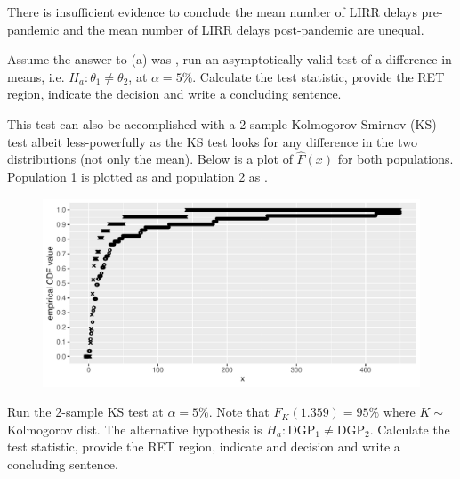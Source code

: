 \documentclass[12pt]{article}
\begin{document}
\begin{enumerate}[(a)]
{There is insufficient evidence to conclude the mean number of LIRR delays pre-pandemic and the mean number of LIRR delays post-pandemic are unequal.

}
\pagebreak

 Assume the answer to (a) was , run an asymptotically valid test of a difference in means, i.e. $H_a: \theta_1 \neq \theta_2$, at $\alpha = 5\%$. Calculate the test statistic, provide the RET region, indicate the decision and write a concluding sentence.


 This test can also be accomplished with a 2-sample Kolmogorov-Smirnov (KS) test albeit less-powerfully as the KS test looks for any difference in the two distributions (not only the mean). Below is a plot of $\hat{F}(x)$ for both populations. Population 1 is plotted as  and population 2 as .

\vspace{0cm}
\begin{figure}[htp]
\centering
\includegraphics[width=6in]{empirical_cdfs}
\end{figure}
\vspace{-0.5cm}

Run the 2-sample KS test at $\alpha = 5\%$. Note that $F_K(1.359) = 95\%$ where $K \sim $ Kolmogorov dist. The alternative hypothesis is $H_a: \text{DGP}_1 \neq \text{DGP}_2$. Calculate the test statistic, provide the RET region, indicate and decision and write a concluding sentence.\\


\end{enumerate}
\end{document}
